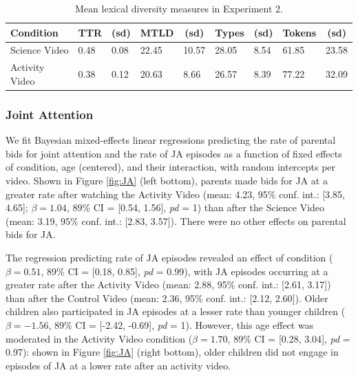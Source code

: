 \documentclass[
  english,
  man]{apa6}
\begin{document}
\begin{table}[tbp]

\begin{center}
\begin{threeparttable}

\caption{\label{tab:e2tab}Mean lexical diversity measures in Experiment 2.}

\begin{tabular}{lllllllll}
\toprule
Condition & \multicolumn{1}{c}{TTR} & \multicolumn{1}{c}{(sd)} & \multicolumn{1}{c}{MTLD} & \multicolumn{1}{c}{(sd)} & \multicolumn{1}{c}{Types} & \multicolumn{1}{c}{(sd)} & \multicolumn{1}{c}{Tokens} & \multicolumn{1}{c}{(sd)}\\
\midrule
Science Video & 0.48 & 0.08 & 22.45 & 10.57 & 28.05 & 8.54 & 61.85 & 23.58\\
Activity Video & 0.38 & 0.12 & 20.63 & 8.66 & 26.57 & 8.39 & 77.22 & 32.09\\
\bottomrule
\end{tabular}

\end{threeparttable}
\end{center}

\end{table}

\hypertarget{joint-attention-1}{%
\subsubsection{Joint Attention}\label{joint-attention-1}}

We fit Bayesian mixed-effects linear regressions predicting the rate of parental bids for joint attention and the rate of JA episodes as a function of fixed effects of condition, age (centered), and their interaction, with random intercepts per video.
Shown in Figure \ref{fig:JA} (left bottom), parents made bids for JA at a greater rate after watching the Activity Video (mean: 4.23, 95\% conf. int.: {[}3.85, 4.65{]}; \(\beta=1.04\), 89\% CI = {[}0.54, 1.56{]}, \emph{pd} = 1) than after the Science Video (mean: 3.19, 95\% conf. int.: {[}2.83, 3.57{]}).
There were no other effects on parental bids for JA.

The regression predicting rate of JA episodes revealed an effect of condition (\(\beta=0.51\), 89\% CI = {[}0.18, 0.85{]}, \emph{pd} = 0.99), with JA episodes occurring at a greater rate after the Activity Video (mean: 2.88, 95\% conf. int.: {[}2.61, 3.17{]}) than after the Control Video (mean: 2.36, 95\% conf. int.: {[}2.12, 2.60{]}).
Older children also participated in JA episodes at a lesser rate than younger children (\(\beta=-1.56\), 89\% CI = {[}-2.42, -0.69{]}, \emph{pd} = 1).
However, this age effect was moderated in the Activity Video condition (\(\beta=1.70\), 89\% CI = {[}0.28, 3.04{]}, \emph{pd} = 0.97): shown in Figure \ref{fig:JA} (right bottom), older children did not engage in episodes of JA at a lower rate after an activity video.
\end{document}

